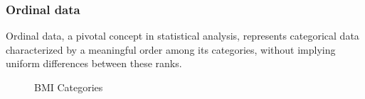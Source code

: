 \documentclass[xcolor=svgnames]{beamer}
\begin{document}
\begin{frame}\frametitle{Ordinal data}


Ordinal data, a pivotal concept in statistical analysis, represents categorical data characterized by a meaningful order among its categories, without implying uniform differences between these ranks.


\begin{figure}
  \centering
  \caption{BMI Categories~\cite{article}}
\end{figure}



\end{frame}
\end{document}
